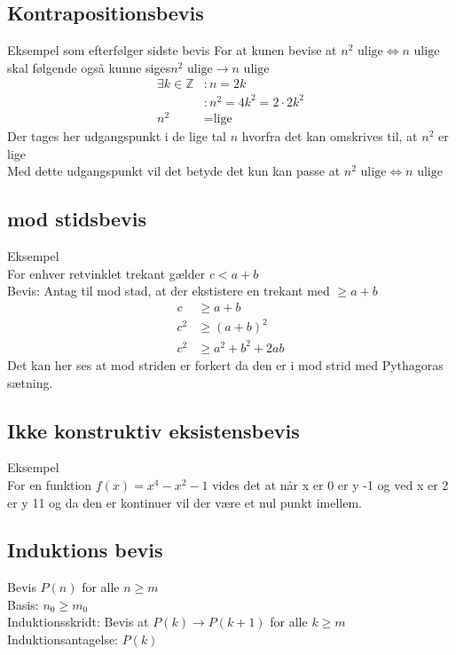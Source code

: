\documentclass[12pt, a4paper]{article}
\begin{document}
			\subsection{Kontrapositionsbevis}
			 Eksempel som efterfølger sidste bevis 
			 	For at kunen bevise at $n^2 \text{ ulige} \iff n \text{ ulige}$ skal følgende også kunne siges$n^2 \text{ ulige} \rightarrow n \text{ ulige}$
				\begin{align}
					\exists k \in \mathbb{Z}&: n=2k\\
								&:n^2=4k^2=2\cdot 2k^2\\
					n^2&=\text{lige}
				\end{align}
				Der tages her udgangspunkt i de lige tal $n$ hvorfra det kan omskrives til, at $n^2$ er lige\\
				Med dette udgangspunkt vil det betyde det kun kan passe at $n^2 \text{ ulige} \iff n \text{ ulige}$ 
			\subsection{\; mod \;stidsbevis}
				Eksempel\\
				For enhver retvinklet trekant gælder $c < a+b$\\
				Bevis: Antag til \; mod \;stad, at der ekstistere en trekant med $\geq a+b$
				\begin{align*}
					c&\geq a+b\\
					c^2&\geq (a+b)^2\\
					c^2&\geq a^2+b^2+2ab
				\end{align*}
				Det kan her ses at \; mod \;striden er forkert da den er i \; mod \;strid med Pythagoras sætning.
			\subsection{Ikke konstruktiv eksistensbevis}
				Eksempel\\
				For en funktion $f(x)=x^4-x^2-1$ vides det at når x er 0 er y -1 og ved x er 2 er y 11 og da den er kontinuer vil der være et nul punkt imellem.
			\subsection{Induktions bevis}
				Bevis $P(n)$ for alle $n\geq m$\\
				Basis: $n_0 \geq m_0$\\ 
				Induktionsskridt: Bevis at $P(k)\rightarrow P(k+1)$ for alle $k\geq m$\\
				Induktionsantagelse: $P(k)$
\end{document}
